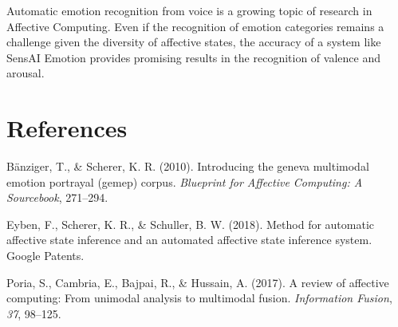 \documentclass[]{elsarticle} %
\begin{document}
Automatic emotion recognition from voice is a growing topic of research
in Affective Computing. Even if the recognition of emotion categories
remains a challenge given the diversity of affective states, the
accuracy of a system like SensAI Emotion provides promising results in
the recognition of valence and arousal.

\section*{References}\label{references}

\hypertarget{refs}{}
\hypertarget{ref-banziger2010introducing}{}
Bänziger, T., \& Scherer, K. R. (2010). Introducing the geneva
multimodal emotion portrayal (gemep) corpus. \emph{Blueprint for
Affective Computing: A Sourcebook}, 271--294.

\hypertarget{ref-eyben2018method}{}
Eyben, F., Scherer, K. R., \& Schuller, B. W. (2018). Method for
automatic affective state inference and an automated affective state
inference system. Google Patents.

\hypertarget{ref-poria2017review}{}
Poria, S., Cambria, E., Bajpai, R., \& Hussain, A. (2017). A review of
affective computing: From unimodal analysis to multimodal fusion.
\emph{Information Fusion}, \emph{37}, 98--125.
\end{document}
